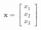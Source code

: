 \documentclass[preview]{standalone}
\begin{document}
\begin{align*}
\mathbf{x} = \begin{bmatrix} x_1 \\ x_2 \\ x_3 \end{bmatrix}
\end{align*}
\end{document}
